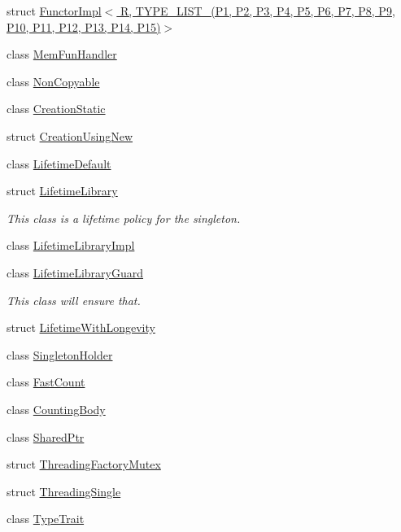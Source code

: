 \begin{DoxyCompactItemize}
\item 
struct \hyperlink{structutilspp_1_1FunctorImpl_3_01R_00_01TYPE__LIST__15_07P1_00_01P2_00_01P3_00_01P4_00_01P5_00_03f6bfb72f2977866a35a5dbc6e440ab4}{Functor\-Impl$<$ R, T\-Y\-P\-E\-\_\-\-L\-I\-S\-T\-\_(\-P1, P2, P3, P4, P5, P6, P7, P8, P9, P10, P11, P12, P13, P14, P15)$>$}
\item 
class \hyperlink{classutilspp_1_1MemFunHandler}{Mem\-Fun\-Handler}
\item 
class \hyperlink{classutilspp_1_1NonCopyable}{Non\-Copyable}
\item 
class \hyperlink{classutilspp_1_1CreationStatic}{Creation\-Static}
\item 
struct \hyperlink{structutilspp_1_1CreationUsingNew}{Creation\-Using\-New}
\item 
class \hyperlink{classutilspp_1_1LifetimeDefault}{Lifetime\-Default}
\item 
struct \hyperlink{structutilspp_1_1LifetimeLibrary}{Lifetime\-Library}
\begin{DoxyCompactList}\small\item\em This class is a lifetime policy for the singleton. \end{DoxyCompactList}\item 
class \hyperlink{classutilspp_1_1LifetimeLibraryImpl}{Lifetime\-Library\-Impl}
\item 
class \hyperlink{classutilspp_1_1LifetimeLibraryGuard}{Lifetime\-Library\-Guard}
\begin{DoxyCompactList}\small\item\em This class will ensure that. \end{DoxyCompactList}\item 
struct \hyperlink{structutilspp_1_1LifetimeWithLongevity}{Lifetime\-With\-Longevity}
\item 
class \hyperlink{classutilspp_1_1SingletonHolder}{Singleton\-Holder}
\item 
class \hyperlink{classutilspp_1_1FastCount}{Fast\-Count}
\item 
class \hyperlink{classutilspp_1_1CountingBody}{Counting\-Body}
\item 
class \hyperlink{classutilspp_1_1SharedPtr}{Shared\-Ptr}
\item 
struct \hyperlink{structutilspp_1_1ThreadingFactoryMutex}{Threading\-Factory\-Mutex}
\item 
struct \hyperlink{structutilspp_1_1ThreadingSingle}{Threading\-Single}
\item 
class \hyperlink{classutilspp_1_1TypeTrait}{Type\-Trait}

\end{DoxyCompactItemize}
